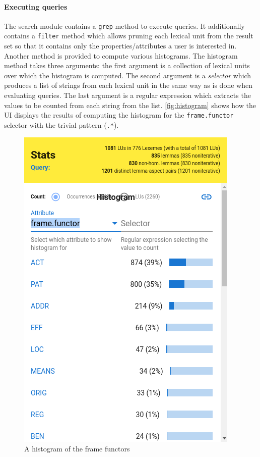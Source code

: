 \documentclass[10pt, a4paper, twocolumn]{article} %
\newcommand{\py}[1]{{\tt #1}}
\begin{document}
\paragraph{Executing queries}
The search module contains a \py{grep} method to execute queries. It additionally contains a \py{filter}
method which allows pruning each lexical unit from the result set so that it contains only the properties/attributes a user is interested in. Another method is provided to compute various histograms.
The histogram method takes three arguments: the first argument is a collection of lexical units over which the histogram is computed. The second argument is a \emph{selector} which produces a list of strings
from each lexical unit in the same way as is done when evaluating queries. The last argument is a
regular expression which extracts the values to be counted from each string from the list. \autoref{fig:histogram}
shows how the UI displays the results of computing the histogram for the {\tt frame.functor} selector with
the trivial pattern ({\tt .*}).
\begin{figure}
    \includegraphics[width=\hsize]{images/histogram.png}
    \caption{\label{fig:histogram}A histogram of the frame functors}
\end{figure}
\end{document}
